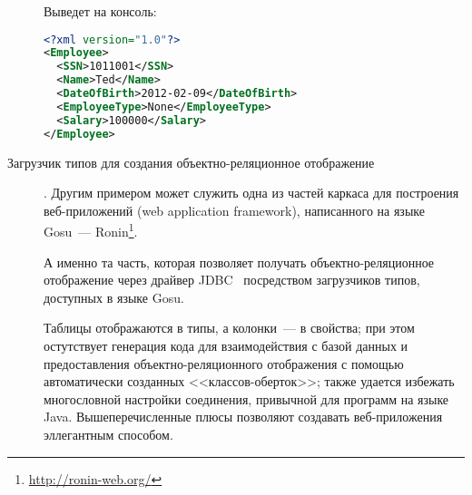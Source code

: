 \begin{description}
\begin{code}
Выведет на консоль:
\begin{lstlisting}[language=xml]
<?xml version="1.0"?>
<Employee>
  <SSN>1011001</SSN>
  <Name>Ted</Name>
  <DateOfBirth>2012-02-09</DateOfBirth>
  <EmployeeType>None</EmployeeType>
  <Salary>100000</Salary>
</Employee>
\end{lstlisting}

\end{code}


\item[Загрузчик типов для создания объектно-реляционное отображение]. Другим примером может служить одна из частей каркаса для построения веб-приложений (web application framework), написанного на языке Gosu~--- Ronin\footnote{\url{http://ronin-web.org/}}.

А именно та часть, которая позволяет получать объектно-реляционное отображение через драйвер JDBC~\cite{jdbc-book} посредством загрузчиков типов, доступных в языке Gosu.

Таблицы отображаются в типы, а колонки~--- в свойства; при этом остутствует генерация кода для взаимодействия с базой данных и предоставления объектно-реляционного отображения с помощью автоматически созданных <<классов-оберток>>; также удается избежать многословной настройки соединения, привычной для программ на языке Java.
Вышеперечисленные плюсы позволяют создавать веб-приложения эллегантным способом.

\end{description}